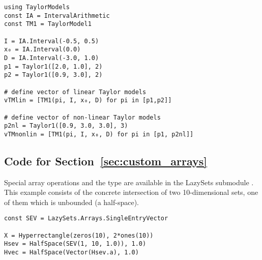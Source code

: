 \begin{minipage}{\linewidth}
\begin{lstlisting}
using TaylorModels
const IA = IntervalArithmetic
const TM1 = TaylorModel1

I = IA.Interval(-0.5, 0.5)
x₀ = IA.Interval(0.0)
D = IA.Interval(-3.0, 1.0)
p1 = Taylor1([2.0, 1.0], 2)
p2 = Taylor1([0.9, 3.0], 2)

# define vector of linear Taylor models
vTMlin = [TM1(pi, I, x₀, D) for pi in [p1,p2]]

# define vector of non-linear Taylor models
p2nl = Taylor1([0.9, 3.0, 3.0], 3)
vTMnonlin = [TM1(pi, I, x₀, D) for pi in [p1, p2nl]]
\end{lstlisting}
\end{minipage}

\subsection{Code for Section~\ref{sec:custom_arrays}}

Special array operations and the type  are available in the LazySets submodule . This example consists of the concrete intersection of two 10-dimensional sets, one of them which is unbounded (a half-space).

\begin{minipage}{\linewidth}
\begin{lstlisting}
const SEV = LazySets.Arrays.SingleEntryVector

X = Hyperrectangle(zeros(10), 2*ones(10))
Hsev = HalfSpace(SEV(1, 10, 1.0)), 1.0)
Hvec = HalfSpace(Vector(Hsev.a), 1.0)
\end{lstlisting}
\end{minipage}





